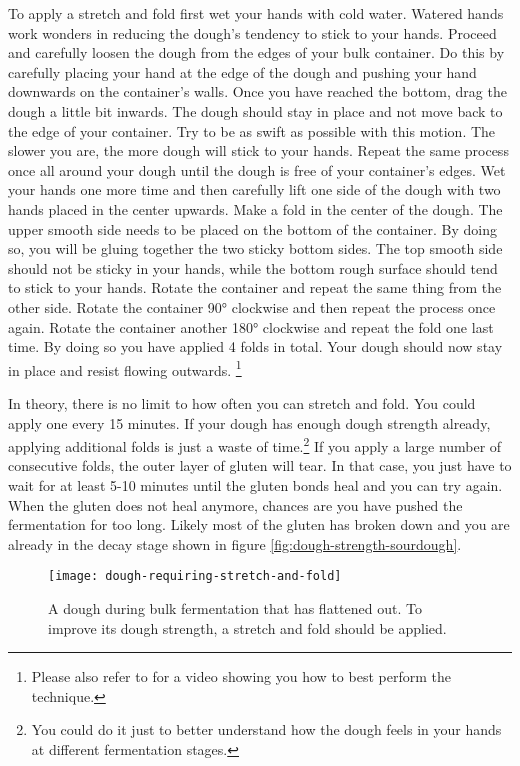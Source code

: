 To apply a stretch and fold first wet your hands with cold water. Watered hands
work wonders in reducing the dough's tendency to stick to your hands. Proceed and
carefully loosen the dough from the edges of your bulk container. Do this by
carefully placing your hand at the edge of the dough and pushing your hand
downwards on the container's walls. Once you have reached the bottom, drag the dough
a little bit inwards. The dough should stay in place and not move back to the
edge of your container. Try to be as swift as possible with this motion. The
slower you are, the more dough will stick to your hands. Repeat the same process
once all around your dough until the dough is free of your container's edges.
Wet your hands one more time and then carefully lift one side of the dough with
two hands placed in the center upwards. Make a fold in the center of the dough.
The upper smooth side needs to be placed on the bottom of the container. By doing
so, you will be gluing together the two sticky bottom sides. The top smooth side should
not be sticky in your hands, while the bottom rough surface should tend
to stick to your hands. Rotate the container
and repeat the same thing from the other side. Rotate the container 90°
clockwise and then repeat the process once again. Rotate the container another 180° clockwise
and repeat the fold one last time. By doing so you have applied 4 folds in total. Your
dough should now stay in place and resist flowing outwards.
\footnote{Please also refer to \cite{stretch+and+fold+technique} for a video showing
you how to best perform the technique.}

In theory, there is no limit to how often you can stretch and fold. You could
apply one every 15 minutes. If your dough has enough dough strength already,
applying additional folds is just a waste of time.\footnote{You could do it just to better understand how the
dough feels in your hands at different fermentation stages.} If you apply a
large number of consecutive folds, the outer layer of gluten
will tear. In that case, you just have to wait for at least 5-10 minutes until
the gluten bonds heal and you can try again. When the gluten does not heal
anymore, chances are you have pushed the fermentation for too long. Likely
most of the gluten has broken down and you are already
in the decay stage shown in figure \ref{fig:dough-strength-sourdough}.

\begin{figure}[!htb]
  \texttt{[image: dough-requiring-stretch-and-fold]}
  \caption{A dough during bulk fermentation that has flattened out. To improve
  its dough strength, a stretch and fold should be applied.}
\end{figure}

